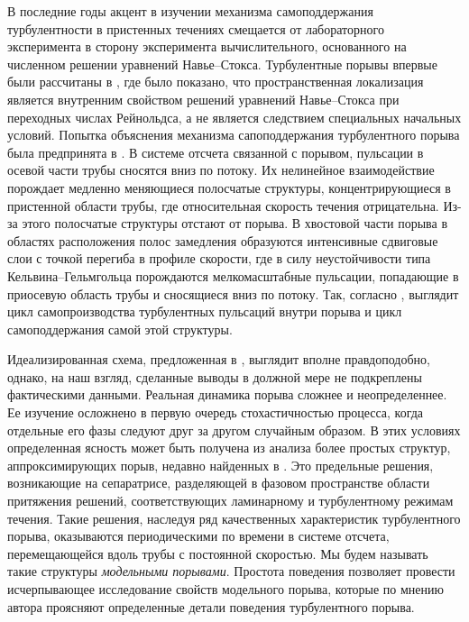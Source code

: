 В последние годы акцент в изучении механизма самоподдержания турбулентности в пристенных течениях смещается от лабораторного эксперимента в сторону эксперимента вычислительного, основанного на численном решении уравнений Навье--Стокса. Турбулентные порывы впервые были рассчитаны в \cite{Priymak2004}, где было показано, что пространственная локализация является внутренним свойством решений уравнений Навье--Стокса при переходных числах Рейнольдса, а не является следствием специальных начальных условий. Попытка объяснения механизма сапоподдержания турбулентного порыва была предпринята в \cite{Shimizu2009}. В системе отсчета связанной с порывом, пульсации в осевой части трубы сносятся вниз по потоку. Их нелинейное взаимодействие порождает медленно меняющиеся полосчатые структуры, концентрирующиеся в пристенной области трубы, где относительная скорость течения отрицательна. Из-за этого полосчатые структуры отстают от порыва. В хвостовой части порыва в областях расположения полос замедления образуются интенсивные сдвиговые слои с точкой перегиба в профиле скорости, где в силу неустойчивости типа Кельвина--Гельмгольца порождаются мелкомасштабные пульсации, попадающие в приосевую область трубы и сносящиеся вниз по потоку. Так, согласно \cite{Shimizu2009}, выглядит цикл самопроизводства турбулентных пульсаций внутри порыва и цикл самоподдержания самой этой структуры.

Идеализированная схема, предложенная в \cite{Shimizu2009}, выглядит вполне правдоподобно, однако, на наш взгляд, сделанные выводы в должной мере не подкреплены фактическими данными. Реальная динамика порыва сложнее и неопределеннее. Ее изучение осложнено в первую очередь стохастичностью процесса, когда отдельные его фазы следуют друг за другом случайным образом. В этих условиях определенная ясность может быть получена из анализа более простых структур, аппроксимирующих порыв, недавно найденных в \cite{Skufca2006, Avila2013}. Это предельные решения, возникающие на сепаратрисе, разделяющей в фазовом пространстве области притяжения решений, соответствующих ламинарному и турбулентному режимам течения. Такие решения, наследуя ряд качественных характеристик турбулентного порыва, оказываются периодическими по времени в системе отсчета, перемещающейся вдоль трубы с постоянной скоростью. Мы будем называть такие структуры {\it модельными порывами}. Простота поведения позволяет провести исчерпывающее исследование свойств модельного порыва, которые по мнению автора проясняют определенные детали поведения турбулентного порыва. 

